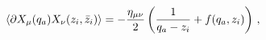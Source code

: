 \begin{equation}
\langle \partial X_\mu(q_a) X_\nu(z_i,\bar z_i)\rangle =
-{\eta_{\mu\nu}\over 2} \left( { 1\over q_a - z_i } +
f(q_a,z_i)\right) \, , \label{eqpxx}
\end{equation}

